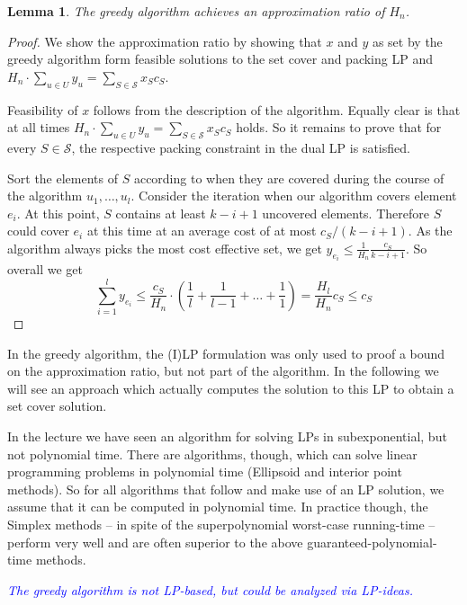 \documentclass{article}
\newtheorem{lemma}{Lemma}
\begin{document}
\begin{lemma}
The greedy algorithm achieves an approximation ratio of $H_n$.
\end{lemma}
\begin{proof}
We show the approximation ratio by showing that $x$ and $y$ as set by the greedy algorithm form feasible solutions
to the set cover and packing LP and $H_n \cdot \sum_{u \in U} y_u = \sum_{S \in \mathcal{S}} x_S c_S$.

Feasibility of $x$ follows from the description of the algorithm. Equally clear is that at all times 
$H_n \cdot \sum_{u \in U} y_u = \sum_{S \in \mathcal{S}} x_S c_S$ holds. So it remains to prove that
for every $S\in \mathcal{S}$, the respective packing constraint in the dual LP is satisfied.

Sort the elements of $S$ according to when they are covered during the course of the algorithm $u_1, \dots, u_l$. 
Consider the iteration when our algorithm covers element $e_i$. At this point, $S$ contains at least
$k-i+1$ uncovered elements. Therefore $S$ could cover $e_i$ at this time at an average cost of at most
$c_S/(k-i+1)$. As the algorithm always picks the most cost effective set, we get
$y_{e_i} \leq \frac{1}{H_n} \frac{c_S}{k-i+1}$. So overall we get 
\[
\sum_{i=1}^{l} y_{e_i} \leq \frac{c_S}{H_n}\cdot (\frac{1}{l}+\frac{1}{l-1}+\dots +\frac{1}{1})= \frac{H_l}{H_n}c_S\leq c_S
\]

\end{proof}



In the greedy algorithm, the (I)LP formulation was only used to proof a bound on the approximation ratio, but not part of
the algorithm. In the following we will see an approach which actually computes the solution to this LP to obtain
a set cover solution.

 In the lecture we have seen an algorithm for solving LPs in subexponential, but not polynomial time. There are
algorithms, though, which can solve linear programming problems in polynomial time (Ellipsoid and interior point methods).
So for all algorithms that follow and make use of an LP solution, we assume that it can be computed in polynomial time.
In practice though, the Simplex methods -- in spite of the superpolynomial worst-case running-time -- perform very well
and are often superior to the above guaranteed-polynomial-time methods.

\textcolor{blue}{\emph{The greedy algorithm is not LP-based, but could be analyzed via LP-ideas.}}
\end{document}
